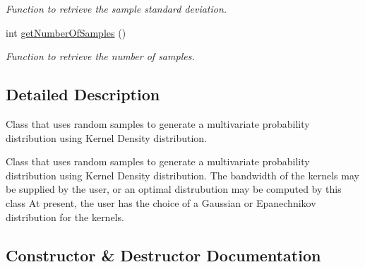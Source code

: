 \begin{DoxyCompactItemize}
\begin{DoxyCompactList}\small\item\em Function to retrieve the sample standard deviation. \end{DoxyCompactList}\item 
int \hyperlink{classtudat_1_1statistics_1_1KernelDensityDistribution_aea73cb503e18645c591dfc52e589be99}{get\+Number\+Of\+Samples} ()
\begin{DoxyCompactList}\small\item\em Function to retrieve the number of samples. \end{DoxyCompactList}\end{DoxyCompactItemize}


\subsection{Detailed Description}
Class that uses random samples to generate a multivariate probability distribution using Kernel Density distribution. 

Class that uses random samples to generate a multivariate probability distribution using Kernel Density distribution. The bandwidth of the kernels may be supplied by the user, or an optimal distrubution may be computed by this class At present, the user has the choice of a Gaussian or Epanechnikov distribution for the kernels. 

\subsection{Constructor \& Destructor Documentation}
